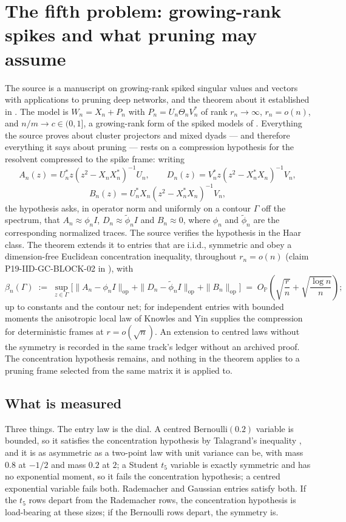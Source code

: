 \documentclass[11pt]{article}
\theoremstyle{definition}
\begin{document}
\section{The fifth problem: growing-rank spikes and what pruning may assume}\label{sec:prune}

The source is a manuscript on growing-rank spiked singular values and vectors with applications to
pruning deep networks, and the theorem about it established in \cite{PN24}. The model is
$W_n=X_n+P_n$ with $P_n=U_n\Theta_nV_n^*$ of rank $r_n\to\infty$, $r_n=o(n)$, and $n/m\to c\in(0,1]$,
a growing-rank form of the spiked models of \cite{BBP,BGN}. Everything the source proves about
cluster projectors and mixed dyads --- and therefore everything it says about pruning --- rests on a
compression hypothesis for the resolvent compressed to the spike frame: writing
\[
A_n(z)=U_n^*z(z^2-X_nX_n^*)^{-1}U_n,\qquad
D_n(z)=V_n^*z(z^2-X_n^*X_n)^{-1}V_n,
\]
\[
B_n(z)=U_n^*X_n(z^2-X_n^*X_n)^{-1}V_n,
\]
the hypothesis asks, in operator norm and uniformly on a contour $\Gamma$ off the spectrum, that
$A_n\approx\phi_nI$, $D_n\approx\widetilde\phi_nI$ and $B_n\approx0$, where $\phi_n$ and
$\widetilde\phi_n$ are the corresponding normalized traces. The source verifies the hypothesis in the
Haar class. The theorem extends it to entries that are i.i.d., symmetric and obey a dimension-free
Euclidean concentration inequality, throughout $r_n=o(n)$ (claim P19-IID-GC-BLOCK-02 in
\cite{PN24}), with
\begin{equation}\label{eq:prunerate}
\beta_n(\Gamma)\;:=\;\sup_{z\in\Gamma}\Big[\|A_n-\phi_nI\|_{\mathrm{op}}+\|D_n-\widetilde\phi_nI\|_{\mathrm{op}}
+\|B_n\|_{\mathrm{op}}\Big]
\;=\;O_{\mathbb P}\!\left(\sqrt{\frac{r}{n}}+\sqrt{\frac{\log n}{n}}\right);
\end{equation}
up to constants and the contour net; for independent entries with bounded moments the anisotropic
local law of Knowles and Yin \cite{KnowlesYin} supplies the compression for deterministic frames at
$r=o(\sqrt n)$. An extension to centred laws without the symmetry is recorded in the same track's
ledger without an archived proof. The concentration hypothesis remains, and nothing in the theorem
applies to a pruning frame selected from the same matrix it is applied to.

\subsection{What is measured}

Three things. The entry law is the dial. A centred Bernoulli$(0.2)$ variable is bounded, so it
satisfies the concentration hypothesis by Talagrand's inequality \cite{Talagrand}, and it is as
asymmetric as a two-point law with unit variance can be, with mass $0.8$ at $-1/2$ and mass $0.2$ at
$2$; a Student $t_5$ variable is exactly symmetric and has no exponential moment, so it fails the
concentration hypothesis; a centred exponential variable fails both. Rademacher and Gaussian entries
satisfy both. If the $t_5$ rows depart from the Rademacher rows, the concentration hypothesis is
load-bearing at these sizes; if the Bernoulli rows depart, the symmetry is.
\end{document}
